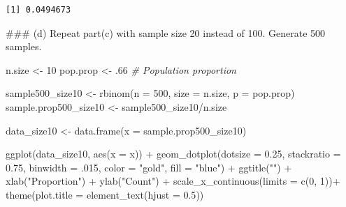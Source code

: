 \documentclass[
]{book}
\newenvironment{Shaded}{\begin{snugshade}}{\end{snugshade}}
\newcommand{\AttributeTok}[1]{\textcolor[rgb]{0.77,0.63,0.00}{#1}}
\newcommand{\CommentTok}[1]{\textcolor[rgb]{0.56,0.35,0.01}{\textit{#1}}}
\newcommand{\DecValTok}[1]{\textcolor[rgb]{0.00,0.00,0.81}{#1}}
\newcommand{\FloatTok}[1]{\textcolor[rgb]{0.00,0.00,0.81}{#1}}
\newcommand{\FunctionTok}[1]{\textcolor[rgb]{0.00,0.00,0.00}{#1}}
\newcommand{\NormalTok}[1]{#1}
\newcommand{\OtherTok}[1]{\textcolor[rgb]{0.56,0.35,0.01}{#1}}
\newcommand{\SpecialCharTok}[1]{\textcolor[rgb]{0.00,0.00,0.00}{#1}}
\newcommand{\StringTok}[1]{\textcolor[rgb]{0.31,0.60,0.02}{#1}}
\begin{document}
\begin{verbatim}
[1] 0.0494673
\end{verbatim}

\#\#\# (d) Repeat part(c) with sample size 20 instead of 100. Generate 500 samples.

\begin{Shaded}
\begin{Highlighting}[]
\NormalTok{n.size }\OtherTok{\textless{}{-}} \DecValTok{10}
\NormalTok{pop.prop }\OtherTok{\textless{}{-}}\NormalTok{ .}\DecValTok{66} \CommentTok{\# Population proportion}

\NormalTok{sample500\_size10 }\OtherTok{\textless{}{-}} \FunctionTok{rbinom}\NormalTok{(}\AttributeTok{n =} \DecValTok{500}\NormalTok{, }\AttributeTok{size =}\NormalTok{ n.size, }\AttributeTok{p =}\NormalTok{ pop.prop)  }
\NormalTok{sample.prop500\_size10 }\OtherTok{\textless{}{-}}\NormalTok{ sample500\_size10}\SpecialCharTok{/}\NormalTok{n.size }

\NormalTok{data\_size10 }\OtherTok{\textless{}{-}} \FunctionTok{data.frame}\NormalTok{(}\AttributeTok{x =}\NormalTok{ sample.prop500\_size10)}

\FunctionTok{ggplot}\NormalTok{(data\_size10, }\FunctionTok{aes}\NormalTok{(}\AttributeTok{x =}\NormalTok{ x)) }\SpecialCharTok{+}
 \FunctionTok{geom\_dotplot}\NormalTok{(}\AttributeTok{dotsize =} \FloatTok{0.25}\NormalTok{,}
               \AttributeTok{stackratio =} \FloatTok{0.75}\NormalTok{,}
               \AttributeTok{binwidth =}\NormalTok{ .}\DecValTok{015}\NormalTok{,}
               \AttributeTok{color =} \StringTok{"gold"}\NormalTok{,}
               \AttributeTok{fill =} \StringTok{"blue"}\NormalTok{) }\SpecialCharTok{+} 
  \FunctionTok{ggtitle}\NormalTok{(}\StringTok{""}\NormalTok{) }\SpecialCharTok{+}  \FunctionTok{xlab}\NormalTok{(}\StringTok{"Proportion"}\NormalTok{) }\SpecialCharTok{+} \FunctionTok{ylab}\NormalTok{(}\StringTok{"Count"}\NormalTok{) }\SpecialCharTok{+}
  \FunctionTok{scale\_x\_continuous}\NormalTok{(}\AttributeTok{limits =} \FunctionTok{c}\NormalTok{(}\DecValTok{0}\NormalTok{, }\DecValTok{1}\NormalTok{))}\SpecialCharTok{+} 
  \FunctionTok{theme}\NormalTok{(}\AttributeTok{plot.title =} \FunctionTok{element\_text}\NormalTok{(}\AttributeTok{hjust =} \FloatTok{0.5}\NormalTok{))}
\end{Highlighting}
\end{Shaded}
\end{document}
